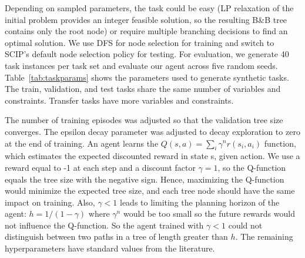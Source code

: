 \documentclass[preprint,12pt]{elsarticle} %
\theoremstyle{plain}
\theoremstyle{definition}
\theoremstyle{remark}
\begin{document}
Depending on sampled parameters, the task could be easy (LP relaxation of the initial problem provides an integer feasible solution, so the resulting B\&B tree contains only the root node) or require multiple branching decisions to find an optimal solution. We use DFS for node selection for training and switch to SCIP's default node selection policy for testing. For evaluation, we generate 40 task instances per task set and evaluate our agent across five random seeds. Table~\ref{tab:taskparams} shows the parameters used to generate synthetic tasks. The train, validation, and test tasks share the same number of variables and constraints. Transfer tasks have more variables and constraints. 

The number of training episodes was adjusted so that the validation tree size converges. The epsilon decay parameter was adjusted to decay exploration to zero at the end of training. An agent learns the $Q(s, a)=\sum_i \gamma ^n r(s_i, a_i)$ function, which estimates the expected discounted reward in state s, given action. We use a reward equal to -1 at each step and a discount factor $\gamma=1$, so the Q-function equals the tree size with the negative sign. Hence, maximizing the Q-function would minimize the expected tree size, and each tree node should have the same impact on training. Also, $\gamma<1$ leads to limiting the planning horizon of the agent: $h = 1/(1-\gamma)$ where $\gamma ^ n$ would be too small so the future rewards would not influence the Q-function. So the agent trained with $\gamma<1$ could not distinguish between two paths in a tree of length greater than $h$. The remaining hyperparameters have standard values from the literature. 
\end{document}
